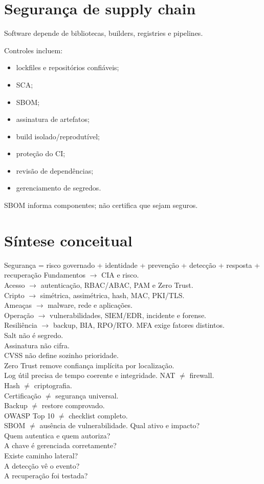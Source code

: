 \section{Segurança de supply chain}

Software depende de bibliotecas, builders, registries e pipelines.

Controles incluem:
\begin{itemize}
\item lockfiles e repositórios confiáveis;
\item SCA;
\item SBOM;
\item assinatura de artefatos;
\item build isolado/reprodutível;
\item proteção do CI;
\item revisão de dependências;
\item gerenciamento de segredos.
\end{itemize}

SBOM informa componentes; não certifica que sejam seguros.

\section{Síntese conceitual}

{Segurança = risco governado + identidade + prevenção + detecção + resposta + recuperação}
{Fundamentos $\rightarrow$ CIA e risco.\\Acesso $\rightarrow$ autenticação, RBAC/ABAC, PAM e Zero Trust.\\Cripto $\rightarrow$ simétrica, assimétrica, hash, MAC, PKI/TLS.\\Ameaças $\rightarrow$ malware, rede e aplicações.\\Operação $\rightarrow$ vulnerabilidades, SIEM/EDR, incidente e forense.\\Resiliência $\rightarrow$ backup, BIA, RPO/RTO.}
{MFA exige fatores distintos.\\Salt não é segredo.\\Assinatura não cifra.\\CVSS não define sozinho prioridade.\\Zero Trust remove confiança implícita por localização.\\Log útil precisa de tempo coerente e integridade.}
{NAT $\neq$ firewall.\\Hash $\neq$ criptografia.\\Certificação $\neq$ segurança universal.\\Backup $\neq$ restore comprovado.\\OWASP Top 10 $\neq$ checklist completo.\\SBOM $\neq$ ausência de vulnerabilidade.}
{Qual ativo e impacto?\\Quem autentica e quem autoriza?\\A chave é gerenciada corretamente?\\Existe caminho lateral?\\A detecção vê o evento?\\A recuperação foi testada?}


